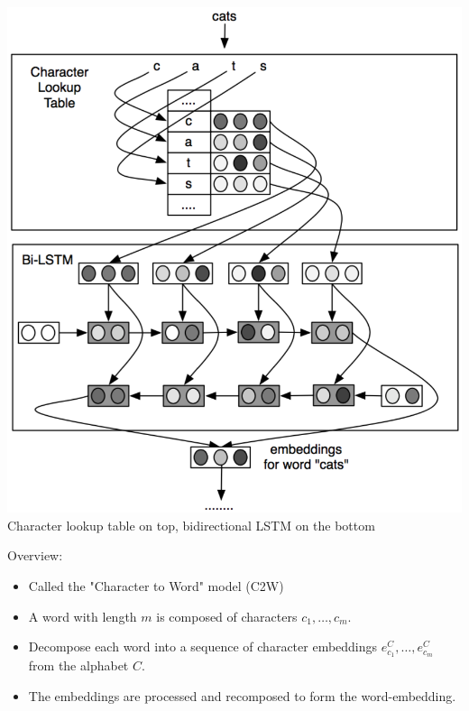 \documentclass[11pt, a4paper, landscape]{article}
\begin{document}
\NewPage{}

\vfill
\begin{minipage}[b]{.4\linewidth}
  \begin{center}
    \includegraphics[width=\linewidth]{../article/img/bi-lstm-emeddings}\\
    Character lookup table on top, bidirectional LSTM on the bottom
  \end{center}
\end{minipage}
\begin{minipage}[b]{.6\linewidth}
  Overview:
  \begin{itemize}
  \item Called the "Character to Word" model (C2W)
  \item A word with length $m$ is composed of characters $c_1, \dots, c_m$.
  \item Decompose each word into a sequence of character embeddings $e_{c_1}^C, \dots, e_{c_m}^C$ from the alphabet $C$.
  \item The embeddings are processed and recomposed to form the word-embedding.
  \end{itemize}
\end{minipage}
\vfill
\end{document}
